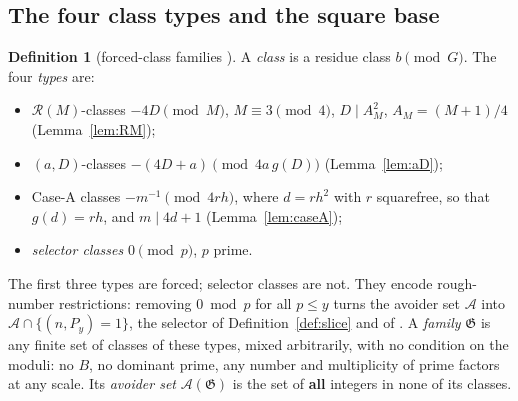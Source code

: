 \documentclass[10pt,reqno]{amsart}
\theoremstyle{definition}
\newtheorem{definition}[theorem]{Definition}
\theoremstyle{remark}
\newcommand{\A}{\mathcal A}
\newcommand{\cR}{\mathscr R}
\newcommand{\cG}{\mathfrak G}
\begin{document}
\subsection{The four class types and the square base}
\begin{definition}[forced-class families {\cite[Def.~2.0]{KA2}}]\label{def:types}
A \emph{class} is a residue class $b\pmod G$.  The four \emph{types} are:
\begin{itemize}
\item $\cR(M)$-classes $-4D\pmod M$, $M\equiv3\pmod4$, $D\mid A_M^2$,
  $A_M=(M+1)/4$ (Lemma~\ref{lem:RM});
\item $(a,D)$-classes $-(4D+a)\pmod{4a\,g(D)}$ (Lemma~\ref{lem:aD});
\item Case-A classes $-m^{-1}\pmod{4rh}$, where $d=rh^2$ with $r$
  squarefree, so that $g(d)=rh$, and $m\mid4d+1$ (Lemma~\ref{lem:caseA});
\item \emph{selector classes} $0\pmod p$, $p$ prime.
\end{itemize}
The first three types are forced; selector classes are not.  They encode
rough-number restrictions: removing $0\bmod p$ for all $p\leq y$ turns
the avoider set $\A$ into $\A\cap\{(n,P_y)=1\}$, the selector of
Definition~\ref{def:slice} and of \cite{TQ}.  A \emph{family} $\cG$ is
any finite set of classes of these types, mixed arbitrarily, with no
condition on the moduli: no $B$, no dominant prime, any number and
multiplicity of prime factors at any scale.  Its \emph{avoider set}
$\A(\cG)$ is the set of \textbf{all} integers in none of its classes.
\end{definition}
\end{document}
